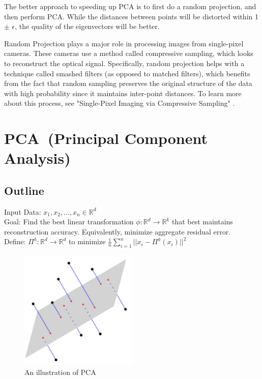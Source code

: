 The better approach to speeding up PCA is to first do a random
projection, and then perform PCA. While the distances between points
will be distorted within 1 $\pm$ $\epsilon$, the quality of the
eigenvectors will be better.

Random Projection plays a major role in processing images from
single-pixel cameras. These cameras use a method called compressive
sampling, which looks to reconstruct the optical signal. 
Specifically, random projection helps with a technique called 
smashed filters (as opposed to matched filters), which benefits from
the fact that random sampling preserves the original structure of the
data with high probability since it maintains inter-point distances. 
To learn more about this process, see "Single-Pixel Imaging via 
Compressive Sampling" \cite{duarte}.

\section{PCA~(Principal Component Analysis)}
\subsection{Outline}
Input Data: $x_1,x_2,...,x_n \in \mathbb{R}^d$\\

\noindent Goal: Find the best linear transformation $\phi:
\mathbb{R}^d \rightarrow \mathbb{R}^k$ that best maintains
reconstruction accuracy. Equivalently, minimize aggregate residual
error.\\ 

\noindent Define: $\Pi^k: \mathbb{R}^d \rightarrow \mathbb{R}^d$ to
minimize $\frac{1}{n} \sum_{i=1}^n ||x_i - \Pi^k (x_i)||^2$\\

\begin{figure}[h!]
\begin{center}
\includegraphics[width=0.5\textwidth]{chapter_6/files/projections.jpg}
\caption{An illustration of PCA}
\end{center}
\end{figure}
